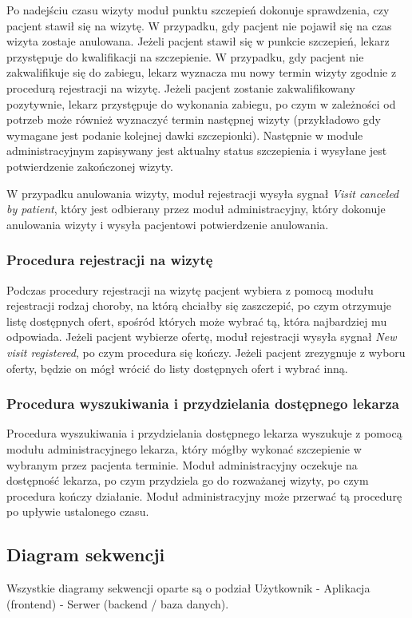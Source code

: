\documentclass[a4paper,12pt,polish]{article}
\begin{document}
Po nadejściu czasu wizyty moduł punktu szczepień dokonuje sprawdzenia, czy pacjent stawił się na wizytę. W przypadku, gdy pacjent nie pojawił się na czas wizyta zostaje anulowana. Jeżeli pacjent stawił się w punkcie szczepień, lekarz przystępuje do kwalifikacji na szczepienie. W przypadku, gdy pacjent nie zakwalifikuje się do zabiegu, lekarz wyznacza mu nowy termin wizyty zgodnie z procedurą rejestracji na wizytę. Jeżeli pacjent zostanie zakwalifikowany pozytywnie, lekarz przystępuje do wykonania zabiegu, po czym w zależności od potrzeb może również wyznaczyć termin następnej wizyty (przykładowo gdy wymagane jest podanie kolejnej dawki szczepionki). Następnie w module administracyjnym zapisywany jest aktualny status szczepienia i wysyłane jest potwierdzenie zakończonej wizyty.

W przypadku anulowania wizyty, moduł rejestracji wysyła sygnał \textit{Visit canceled by patient}, który jest odbierany przez moduł administracyjny, który dokonuje anulowania wizyty i wysyła pacjentowi potwierdzenie anulowania.

\subsubsection{Procedura rejestracji na wizytę}
Podczas procedury rejestracji na wizytę pacjent wybiera z pomocą modułu rejestracji rodzaj choroby, na którą chciałby się zaszczepić, po czym otrzymuje listę dostępnych ofert, spośród których może wybrać tą, która najbardziej mu odpowiada. Jeżeli pacjent wybierze ofertę, moduł rejestracji wysyła sygnał \textit{New visit registered}, po czym procedura się kończy. Jeżeli pacjent zrezygnuje z wyboru oferty, będzie on mógł wrócić do listy dostępnych ofert i wybrać inną.

\subsubsection{Procedura wyszukiwania i przydzielania dostępnego lekarza}
Procedura wyszukiwania i przydzielania dostępnego lekarza wyszukuje z pomocą modułu administracyjnego lekarza, który mógłby wykonać szczepienie w wybranym przez pacjenta terminie. Moduł administracyjny oczekuje na dostępność lekarza, po czym przydziela go do rozważanej wizyty, po czym procedura kończy działanie. Moduł administracyjny może przerwać tą procedurę po upływie ustalonego czasu.

\newpage

\subsection{Diagram sekwencji}
Wszystkie diagramy sekwencji oparte są o podział Użytkownik - Aplikacja (frontend) - Serwer (backend / baza danych).
\end{document}
